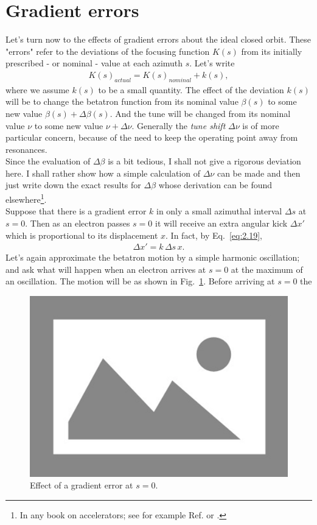 \section{Gradient errors}\label{sec:2.11}

Let’s turn now to the effects of gradient errors about the ideal closed orbit. These "errors" refer to the deviations of the focusing function $K(s)$ from its initially prescribed
- or nominal - value at each azimuth $s$. Let’s write
\begin{align}
	K(s)_{actual} = K(s)_{nominal} + k(s),
\end{align}
where we assume $k(s)$ to be a small quantity. The effect of the deviation $k(s)$ will be to change the betatron function from its nominal value $\beta(s)$ to some new value $\beta(s)+\Delta\beta(s)$. And the tune will be changed from its nominal value $\nu$ to some new value $\nu + \Delta\nu$. Generally the \emph{tune shift} $\Delta\nu$ is of more particular concern, because of the need to keep the operating point away from resonances.\\
Since the evaluation of $\Delta\beta$ is a bit tedious, I shall not give a rigorous deviation
here. I shall rather show how a simple calculation of $\Delta\nu$ can be made and then just write down the exact results for $\Delta\beta$ whose derivation can be found elsewhere\footnote{In any book on accelerators; see for example Ref. \cite{5} or \cite{7}.}.\\
Suppose that there is a gradient error $k$ in only a small azimuthal interval $\Delta s$ at $s = 0$. Then as an electron passes $s = 0$ it will receive an extra angular kick $\Delta x'$ which is proportional to its displacement $x$. In fact, by Eq.~\eqref{eq:2.19},
\begin{align}\label{eq:2.96}
	\Delta x' = k\, \Delta s\, x.
\end{align}
Let’s again approximate the betatron motion by a simple harmonic oscillation; and ask what will happen when an electron arrives at $s = 0$ at the maximum of an oscillation. The motion will be as shown in Fig.~\ref{fig:fig23}. Before arriving at $s = 0$ the
\begin{figure}[!htb]
	\centering
	\includegraphics[width=0.8\linewidth]{./Figuras/placeholder.png}
	\caption{Effect of a gradient error at $s = 0$.}
	\label{fig:fig23}
\end{figure}
